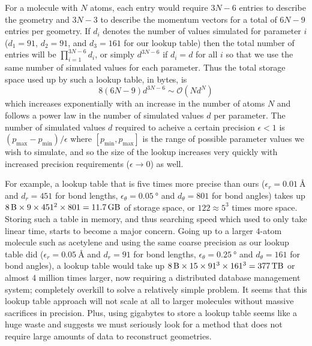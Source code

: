 
For a molecule with $N$ atoms, each entry would require $3N-6$ entries to describe the geometry and $3N-3$ to describe the momentum vectors for a total of $6N-9$ entries per geometry. If $d_i$ denotes the number of values simulated for parameter $i$ ($d_1 = 91$, $d_2 = 91$, and $d_3 = 161$ for our lookup table) then the total number of entries will be $\displaystyle \prod\limits_{i=1}^{3N-6} d_i$, or simply $d^{3N-6}$ if $d_i = d$ for all $i$ so that we use the same number of simulated values for each parameter. Thus the total storage space used up by such a lookup table, in bytes, is
\begin{equation}
8(6N-9)d^{3N-6}\sim \mathcal{O}(Nd^{N})
\end{equation}
which increases exponentially with an increase in the number of atoms $N$ and follows a power law in the number of simulated values $d$ per parameter. The number of simulated values $d$ required to acheive a certain precision $\epsilon < 1$ is $(p_\mathrm{max} - p_\mathrm{min})/\epsilon$ where $[p_\mathrm{min}, p_\mathrm{max}]$ is the range of possible parameter values we wish to simulate, and so the size of the lookup increases very quickly with increased precision requirements ($\epsilon \rightarrow 0$) as well.

For example, a lookup table that is five times more precise than ours ($\epsilon_r = \SI{0.01}{\angstrom}$ and $d_r = 451$ for bond lengths, $\epsilon_\theta = \SI{0.05}{\degree}$ and $d_\theta = 801$ for bond angles) takes up $\SI{8}{\byte} \times 9 \times 451^2 \times 801 = \SI{11.7}{\giga\byte}$ of storage space, or $122 \approx 5^3$ times more space. Storing such a table in memory, and thus searching speed which used to only take linear time, starts to become a major concern. Going up to a larger $4$-atom molecule such as acetylene and using the same coarse precision as our lookup table did ($\epsilon_r = \SI{0.05}{\angstrom}$ and $d_r = 91$ for bond lengths, $\epsilon_\theta = \SI{0.25}{\degree}$ and $d_\theta = 161$ for bond angles), a lookup table would take up $\SI{8}{\byte} \times 15 \times 91^3 \times 161^3 = \SI{377}{\tera\byte}$ or almost 4 million times larger, now requiring a distributed database management system; completely overkill to solve a relatively simple problem. It seems that this lookup table approach will not scale at all to larger molecules without massive sacrifices in precision. Plus, using gigabytes to store a lookup table seems like a huge waste and suggests we must seriously look for a method that does not require large amounts of data to reconstruct geometries.

